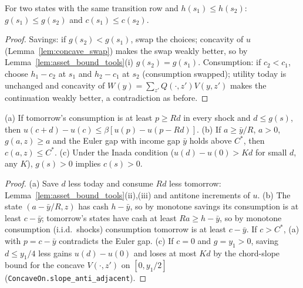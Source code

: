 \begin{theorem}
\label{thm:policy_cons_mono}
\leanok
{}
For two states with the same transition row and $h(s_1)\le h(s_2)$: $g(s_1)\le g(s_2)$ and $c(s_1)\le c(s_2)$.
\end{theorem}
\begin{proof}
\leanok
Savings: if $g(s_2)<g(s_1)$, swap the choices; concavity of $u$ (Lemma~\ref{lem:concave_swap}) makes the swap
weakly better, so by Lemma~\ref{lem:asset_bound_tools}(i) $g(s_2) = g(s_1)$. Consumption: if $c_2<c_1$, choose
$h_1 - c_2$ at $s_1$ and $h_2-c_1$ at $s_2$ (consumption swapped); utility today is unchanged and concavity of
$W(y) = \sum_{z'}Q(\cdot,z')V(y,z')$ makes the continuation weakly better, a contradiction as before.
\end{proof}

\begin{lemma}
\label{lem:asset_bound_steps}
\leanok
{}
(a) If tomorrow's consumption is at least $p\ge Rd$ in every shock and $d\le g(s)$, then
$u(c+d) - u(c) \le \beta[u(p) - u(p-Rd)]$. (b) If $a\ge \bar y/R$, $a>0$, $g(a,z)\ge a$ and the Euler gap with income
gap $\bar y$ holds above $C^*$, then $c(a,z)\le C^*$. (c) Under the Inada condition
($u(d)-u(0) > Kd$ for small $d$, any $K$), $g(s)>0$ implies $c(s)>0$.
\end{lemma}
\begin{proof}
\leanok
(a) Save $d$ less today and consume $Rd$ less tomorrow: Lemma~\ref{lem:asset_bound_tools}(ii),(iii) and antitone
increments of $u$. (b) The state $(a-\bar y/R, z)$ has cash $h - \bar y$, so by monotone savings its consumption is
at least $c-\bar y$; tomorrow's states have cash at least $Ra\ge h-\bar y$, so by monotone consumption (i.i.d.\
shocks) consumption tomorrow is at least $c-\bar y$. If $c>C^*$, (a) with $p = c-\bar y$ contradicts the Euler gap.
(c) If $c=0$ and $g = y_1>0$, saving $d\le y_1/4$ less gains $u(d)-u(0)$ and loses at most $Kd$ by the chord-slope
bound for the concave $V(\cdot,z')$ on $[0,y_1/2]$ (\texttt{ConcaveOn.slope\_anti\_adjacent}).
\end{proof}


